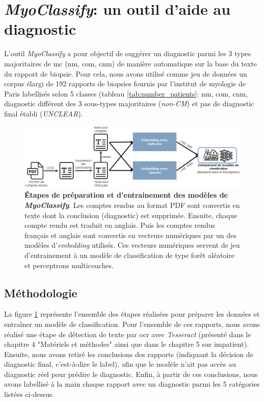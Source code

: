 \section{\textit{MyoClassify}: un outil d'aide au diagnostic}
L'outil \textit{MyoClassify} a pour objectif de suggérer un diagnostic parmi les 3 types majoritaires de \gls{mc} (\gls{nm}, \gls{com}, \gls{cnm}) de manière automatique sur la base du texte du rapport de biopsie. Pour cela, nous avons utilisé comme jeu de données un corpus élargi de 192 rapports de biopsies fournis par l'institut de myologie de Paris labellisés selon 5 classes (tableau \ref{tab:number_patients}: \gls{nm}, \gls{com}, \gls{cnm}, diagnostic différent des 3 sous-types majoritaires (\textit{non-CM}) et pas de diagnostic final établi (\textit{UNCLEAR}).
\begin{figure}[!htbp]
 \centering
 \includegraphics[width=1\textwidth]{figures/myoclassify_flow.png}
 \caption[Entrainement modèle \textit{MyoClassify}]{\textbf{Étapes de préparation et d'entrainement des modèles de \textit{MyoClassify}}. Les comptes rendus au format PDF sont convertis en texte dont la conclusion (diagnostic) est supprimée. Ensuite, chaque compte rendu est traduit en anglais. Puis les comptes rendus français et anglais sont convertis en vecteurs numériques par un des modèles d'\textit{embedding} utilisés. Ces vecteurs numériques servent de jeu d'entrainement à un modèle de classification de type forêt aléatoire et perceptrons multicouches.}
 \label{fig:myoclassify_flow}
\end{figure}
\subsection{Méthodologie}
La figure \ref{fig:myoclassify_flow} représente l'ensemble des étapes réalisées pour préparer les données et entraîner un modèle de classification. Pour l'ensemble de ces rapports, nous avons réalisé une étape de détection de texte par \gls{ocr} avec \textit{Tesseract} (présenté dans le chapitre 4 "Matériels et méthodes" ainsi que dans le chapitre 5 sur \gls{impatient}). Ensuite, nous avons retiré les conclusions des rapports (indiquant la décision de diagnostic final, c'est-à-dire le label), afin que le modèle n'ait pas accès au diagnostic réel pour prédire le diagnostic. Enfin, à partir de ces conclusions, nous avons labellisé à la main chaque rapport avec un diagnostic parmi les 5 catégories listées ci-dessus.

